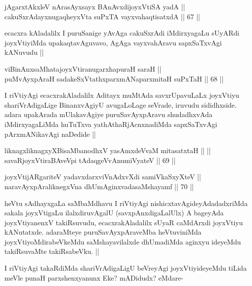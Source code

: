 
\begin{shl}
jAgarxtAkxleV nArasAyxsayx BAnAvxdijoyxVtiSA yadA || \\
cakuSxrAdayxnugaqheyxVta suPxTA vayxvahaqtisatxdA ||  67 ||  
\end{shl}

\begin{artha}
ecacxra kAladalilx I puruSanige yAvAga cakuSxrAdi iMdirxyagaLu sUyARdi joyxVtiyiMda upakaqtavAguvavo, AgAga vayxvahAravu sapxSaTxvAgi kANuvudu ||
\end{artha}

\begin{shl}
viBinAnxsaMhatajoyxVtiranugarxhapuraH saraH || \\
puMvAyxpAraH sadakeSxVtathxparxmANaparxmitaH suPxTaH ||  68 ||  
\end{shl}

\begin{artha}
I riVtiyAgi ecacxrakAladalilx Aditayx muMtAda savxrUpavuLaLx joyxVtiyu shariVrAdigaLige BinanxvAgiyU avugaLoLage seVrade, iruvudu sididhxside. adara upakArada mUlakavAgiye puruSavAyxpAravu shudadhxvAda iMdirxyagaLiMda huTuTxva yathAthaRjAcnxnadiMda sapxSaTxvAgi pArxmANikavAgi naDedide ||
\end{artha}


\begin{shl}
liknagxliknagxyXBisaMbanodhxV yasAmxdeVvaM mitasatxtaH ||  || \\
savaRjoyxVtiraBAveV\s pi tAdaqgeVvAnumiVyateV ||  69 || 
\end{shl}

\begin{shl}
joyxVtijARgariteV yadavxdarxviVnAdxvXdi samiVkaSxyXteV || \\
naravAyxpAraliknegxVna dhUmAginxvadasaMshayamf ||  70 ||  
\end{shl}

\begin{artha}
heVtu sAdhayxgaLa saMbaMdhavu I riVtiyAgi nishicxtavAgideyAdadadxriMda sakala joyxVtigaLu ilalxdiruvAgalU (savxpAnxdigaLalUlx) A bageyAda joyxVtiyanenxV takiRsuvudu, ecacxrakAladalilx sUyaR caMdArxdi joyxVtiyu kANutatxde. adaraMteye puruSavAyxpAraveMba heVtuviniMda joyxVtiyoMdirabeVkeMdu saMshayavilalxde dhUmadiMda aginxyu ideyeMdu takiRsuvaMte takiRsabeVku. ||

I riVtiyAgi takaRdiMda shariVrAdigaLigU beVreyAgi joyxVtiyideyeMdu tiLida meVle punaH parxshenxyanunx Eke? mADidudx? eMdare-
\end{artha}

